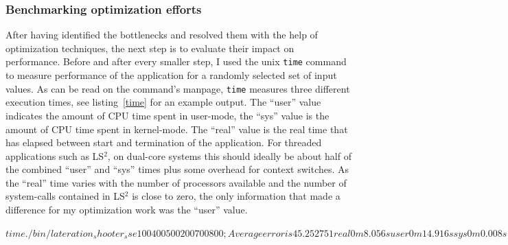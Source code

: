 \subsubsection{Benchmarking optimization efforts}
After having identified the bottlenecks and resolved them with the help of optimization techniques, the next step is to evaluate their impact on performance. Before and after every smaller step, I used the unix \texttt{time} command to measure performance of the application for a randomly selected set of input values. As can be read on the command's manpage, \texttt{time} measures three different execution times, see listing~\ref{time} for an example output. The ``user'' value indicates the amount of CPU time spent in user-mode, the ``sys'' value is the amount of CPU time spent in kernel-mode. The ``real'' value is the real time that has elapsed between start and termination of the application. For threaded applications such as LS$^{2}$, on dual-core systems this should ideally be about half of the combined ``user'' and ``sys'' times plus some overhead for context switches. As the ``real'' time varies with the number of processors available and the number of system-calls contained in LS$^{2}$ is close to zero, the only information that made a difference for my optimization work was the ``user'' value.

\begin{shell}[caption={Example output of the unix \texttt{time} command},label=time]
$ time { ./bin/lateration_shooter_sse 100 400 500 200 700 800 ; }
Average error is 45.252751

real    0m8.056s
user    0m14.916s
sys     0m0.008s
$
\end{shell}

